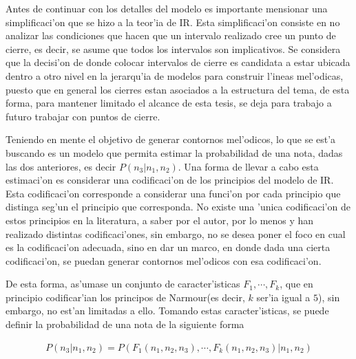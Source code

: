 Antes de continuar con los detalles del modelo es importante mensionar una simplificaci'on que se hizo a la teor'ia de IR.
Esta simplificaci'on consiste en no analizar las condiciones que hacen que un intervalo realizado
cree un punto de cierre, es decir, se asume que todos los intervalos son implicativos. Se considera que la decisi'on de donde colocar intervalos de cierre es candidata 
a estar ubicada dentro a otro nivel en la jerarqu'ia de modelos para construir l'ineas mel'odicas, puesto que en general los cierres estan asociados a la estructura
del tema, de esta forma, para mantener limitado el alcance de esta tesis, se deja para trabajo a futuro trabajar con puntos de cierre.

Teniendo en mente el objetivo de generar contornos mel'odicos, lo que se est'a buscando es un modelo que permita estimar la probabilidad de una nota, 
dadas las dos anteriores, es decir $P(n_3|n_1, n_2)$. Una forma de llevar a cabo esta estimaci'on es considerar una codificaci'on de los principios del modelo de IR.
Esta codificaci'on corresponde a considerar una funci'on por cada principio que distinga seg'un el principio que corresponda. No existe una 'unica codificaci'on
de estos principios en la literatura, a saber por el autor, por lo menos  \cite{PaieThesis} y \cite{Schellenberg97} han realizado distintas codificaci'ones, 
sin embargo, no se desea poner el foco en cual es la codificaci'on adecuada, sino en dar un marco, en donde dada una cierta codificaci'on, 
se puedan generar contornos mel'odicos con esa codificaci'on.

De esta forma, as'umase un conjunto de caracter'isticas $F_1, \cdots, F_k$, que en principio codificar'ian los principos de Narmour(es decir, $k$ ser'ia igual a $5$), 
sin embargo, no est'an limitadas a ello. Tomando estas caracter'isticas, se puede definir la probabilidad de una nota de la siguiente forma

\begin{align}
\label{eq:general_narmour_model}
P(n_3 | n_1, n_2) = P(F_1(n_1, n_2, n_3), \cdots, F_k(n_1, n_2, n_3)|n_1, n_2)
\end{align}

